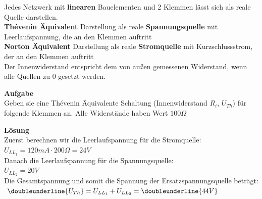 					 \newpage
					\beginip
					Jedes Netzwerk mit \textbf{linearen} Bauelementen und 2 Klemmen lässt sich als reale Quelle darstellen. \\
					\textbf{Thévenin Äquivalent} Darstellung als reale \textbf{Spannungsquelle} mit Leerlaufspannung, die an den Klemmen auftritt \\
					\textbf{Norton Äquivalent} Darstellung als reale \textbf{Stromquelle}  mit Kurzschlussstrom, der an den Klemmen auftritt\\
					Der Innenwiderstand entspricht dem von außen gemessenen Widerstand, wenn alle Quellen zu 0 gesetzt werden.
					\begin{center}
						\fix
					\end{center}
					\iend






					\beginip
					\textbf{Aufgabe}
					\\Geben sie eine Thévenin Äquivalente Schaltung (Innenwiderstand $R_i$, $U_{Th}$) für folgende Klemmen an. Alle Widerstände haben Wert $100\Omega$ \\

					\begin{center}
						\fix
					\end{center}
					\iend
					\beginip
					\textbf{Lösung}
					\\
					Zuerst berechnen wir die Leerlaufspannung für die Stromquelle: \\
					$U_{LL_1} = 120mA \cdot 200 \Omega = 24V$ \\
					Danach die Leerlaufspannung für die Spannungsquelle: \\
					$ U_{LL_2} = 20V$\\
					Die Gesamtspannung und somit die Spannung der Ersatzspannungsquelle beträgt: \\
					$\doubleunderline{U_{Th}} = U_{LL_1} + U_{LL_2} = \doubleunderline{44V}$ \\

